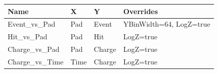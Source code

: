 \begin{longtable}{p{.27\linewidth}p{.12\linewidth}p{.12\linewidth}p{.33\linewidth}}
\textbf{Name} & \textbf{X} & \textbf{Y} & \textbf{Overrides} \\\hline
Event\_vs\_Pad & Pad & Event & YBinWidth=64, LogZ=true \\
Hit\_vs\_Pad & Pad & Hit & LogZ=true \\
Charge\_vs\_Pad & Pad & Charge & LogZ=true \\
Charge\_vs\_Time & Time & Charge & LogZ=true \\
\end{longtable}
